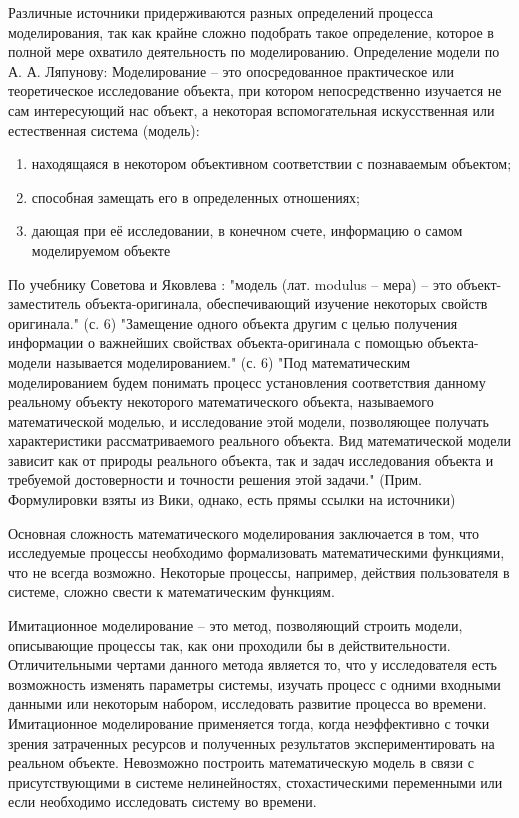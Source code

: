   Различные источники придерживаются разных определений процесса моделирования, так как крайне сложно подобрать такое определение, которое в полной мере охватило деятельность по моделированию. Определение модели по А. А. Ляпунову: Моделирование -- это опосредованное практическое или теоретическое исследование объекта, при котором непосредственно изучается не сам интересующий нас объект, а некоторая вспомогательная искусственная или естественная система (модель):
\begin{enumerate}
\item находящаяся в некотором объективном соответствии с познаваемым объектом;
\item способная замещать его в определенных отношениях;
\item дающая при её исследовании, в конечном счете, информацию о самом моделируемом объекте
\end{enumerate}
  По учебнику Советова и Яковлева : "модель (лат. modulus -- мера) -- это объект-заместитель объекта-оригинала, обеспечивающий изучение некоторых свойств оригинала." (с. 6) "Замещение одного объекта другим с целью получения информации о важнейших свойствах объекта-оригинала с помощью объекта-модели называется моделированием." (с. 6) "Под математическим моделированием будем понимать процесс установления соответствия данному реальному объекту некоторого математического объекта, называемого математической моделью, и исследование этой модели, позволяющее получать характеристики рассматриваемого реального объекта. Вид математической модели зависит как от природы реального объекта, так и задач исследования объекта и требуемой достоверности и точности решения этой задачи." (Прим. Формулировки взяты из Вики, однако, есть прямы ссылки на источники)


  Основная сложность математического моделирования заключается в том, что исследуемые процессы необходимо формализовать математическими функциями, что не всегда возможно. Некоторые процессы, например, действия пользователя в системе, сложно свести к математическим функциям.

  Имитационное моделирование -- это метод, позволяющий строить модели, описывающие процессы так, как они проходили бы в действительности. Отличительными чертами данного метода является то, что у исследователя есть возможность изменять параметры системы, изучать процесс с одними входными данными или некоторым набором, исследовать развитие процесса во времени. Имитационное моделирование применяется тогда, когда неэффективно с точки зрения затраченных ресурсов и полученных результатов экспериментировать на реальном объекте. Невозможно построить математическую модель в связи с присутствующими в системе нелинейностях, стохастическими переменными или если необходимо исследовать систему во времени.


